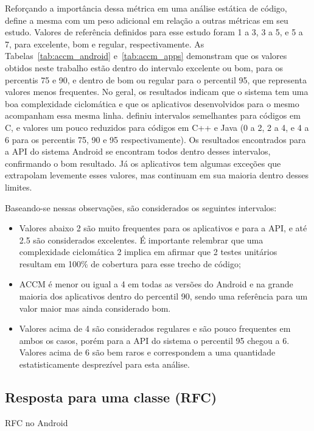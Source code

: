 Reforçando a importância dessa métrica em uma análise estática de código,  define a mesma com um peso adicional em relação a outras métricas em seu estudo. Valores de referência definidos para esse estudo foram 1 a 3, 3 a 5, e 5 a 7, para excelente, bom e regular, respectivamente. As Tabelas~\ref{tab:accm_android} e~\ref{tab:accm_apps} demonstram que os valores obtidos neste trabalho estão dentro do intervalo excelente ou bom, para os percentis 75 e 90, e dentro de bom ou regular para o percentil 95, que representa valores menos frequentes. No geral, os resultados indicam que o sistema tem uma boa complexidade ciclomática e que os aplicativos desenvolvidos para o mesmo acompanham essa mesma linha.  definiu intervalos semelhantes para códigos em C, e valores um pouco reduzidos para códigos em C++ e Java (0 a 2, 2 a 4, e 4 a 6 para os percentis 75, 90 e 95 respectivamente).  Os resultados encontrados para a API do sistema Android se encontram todos dentro desses intervalos, confirmando o bom resultado. Já os aplicativos tem algumas exceções que extrapolam levemente esses valores, mas continuam em sua maioria dentro desses limites.

Baseando-se nessas observações, são considerados os seguintes intervalos:

\begin{itemize}
\item Valores abaixo 2 são muito frequentes para os aplicativos e para a API, e até 2.5 são considerados excelentes. É importante relembrar que uma complexidade ciclomática 2 implica em afirmar que 2 testes unitários resultam em 100\% de cobertura para esse trecho de código;
\item ACCM é menor ou igual a 4 em todas as versões do Android e na grande maioria dos aplicativos dentro do percentil 90, sendo uma referência para um valor maior mas ainda considerado bom.
\item Valores acima de 4 são considerados regulares e são pouco frequentes em ambos os casos, porém para a API do sistema o percentil 95 chegou a 6. Valores acima de 6 são bem raros e correspondem a uma quantidade estatisticamente desprezível para esta análise.
\end{itemize}

\subsection{Resposta para uma classe (RFC)}

\begin{table}[!htb]
\centering
{}

\caption{RFC no Android}
\label{tab:rfc_android}
\end{table}

